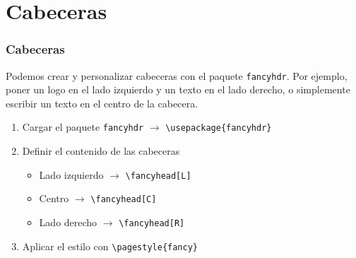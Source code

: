 \section{Cabeceras}

\begin{frame}[fragile]
\frametitle{Cabeceras}
Podemos crear y personalizar cabeceras con el paquete \verb|fancyhdr|. Por ejemplo, poner un logo en el lado izquierdo y un texto en el lado derecho, o simplemente escribir un texto en el centro de la cabecera.
\begin{enumerate}
    \item Cargar el paquete \verb|fancyhdr| $\rightarrow$ \verb|\usepackage{fancyhdr}|
    \item Definir el contenido de las cabeceras 
    \begin{itemize}
        \item Lado izquierdo $\rightarrow$ \verb|\fancyhead[L]|
        \item Centro $\rightarrow$ \verb|\fancyhead[C]|
        \item Lado derecho $\rightarrow$ \verb|\fancyhead[R]|
    \end{itemize}
    \item Aplicar el estilo con \verb|\pagestyle{fancy}|
\end{enumerate}

\end{frame}